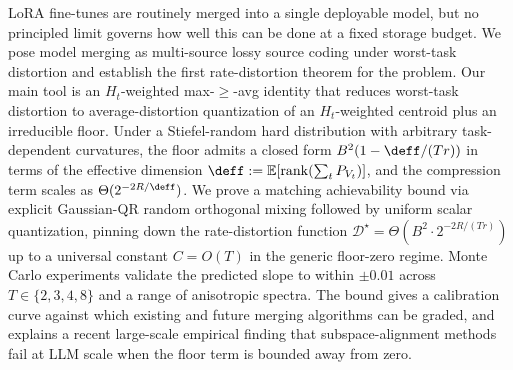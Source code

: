 LoRA fine-tunes are routinely merged into a single deployable
model, but no principled limit governs how well this can be done
at a fixed storage budget. We pose model merging as multi-source
lossy source coding under worst-task distortion and establish
the first rate-distortion theorem for the problem. Our main
tool is an $H_t$-weighted max-$\geq$-avg identity that reduces
worst-task distortion to average-distortion quantization of an
$H_t$-weighted centroid plus an irreducible floor. Under a
Stiefel-random hard distribution with arbitrary task-dependent
curvatures, the floor admits a closed form $B^2(1 - \deff/(Tr))$
in terms of the effective dimension $\deff := \mathbb{E}[
\operatorname{rank}(\sum_t P_{V_t})]$, and the compression term
scales as $\Theta(2^{-2R/\deff})$. We prove a matching
achievability bound via explicit Gaussian-QR random orthogonal
mixing followed by uniform scalar quantization, pinning down the
rate-distortion function $\mathcal{D}^\star = \Theta(B^2 \cdot
2^{-2R/(Tr)})$ up to a universal constant $C = O(T)$ in the
generic floor-zero regime. Monte Carlo experiments validate the
predicted slope to within $\pm 0.01$ across $T\in\{2,3,4,8\}$ and
a range of anisotropic spectra. The bound gives a calibration
curve against which existing and future merging algorithms can
be graded, and explains a recent large-scale empirical finding
that subspace-alignment methods fail at LLM scale when the floor
term is bounded away from zero.
